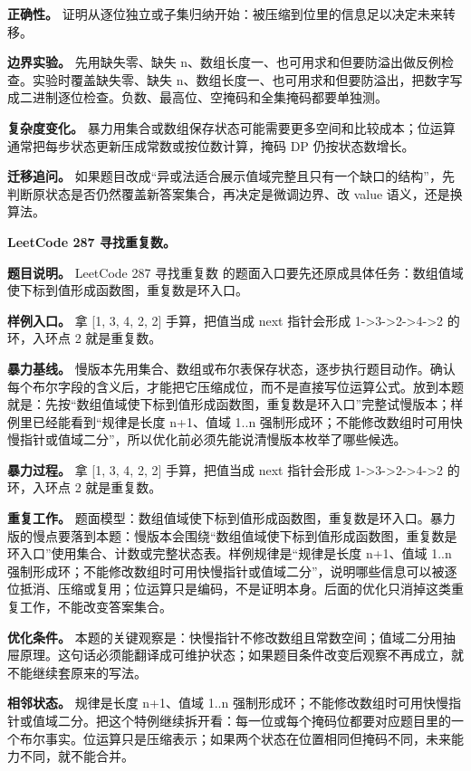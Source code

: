 \textbf{正确性。} 证明从逐位独立或子集归纳开始：被压缩到位里的信息足以决定未来转移。

\textbf{边界实验。} 先用缺失零、缺失 n、数组长度一、也可用求和但要防溢出做反例检查。实验时覆盖缺失零、缺失 n、数组长度一、也可用求和但要防溢出，把数字写成二进制逐位检查。负数、最高位、空掩码和全集掩码都要单独测。

\textbf{复杂度变化。} 暴力用集合或数组保存状态可能需要更多空间和比较成本；位运算通常把每步状态更新压成常数或按位数计算，掩码 DP 仍按状态数增长。

\textbf{迁移追问。} 如果题目改成“异或法适合展示值域完整且只有一个缺口的结构”，先判断原状态是否仍然覆盖新答案集合，再决定是微调边界、改 value 语义，还是换算法。

\noindent\textbf{LeetCode 287 寻找重复数。}

\textbf{题目说明。} LeetCode 287 寻找重复数 的题面入口要先还原成具体任务：数组值域使下标到值形成函数图，重复数是环入口。

\textbf{样例入口。} 拿 [1, 3, 4, 2, 2] 手算，把值当成 next 指针会形成 1->3->2->4->2 的环，入环点 2 就是重复数。

\textbf{暴力基线。} 慢版本先用集合、数组或布尔表保存状态，逐步执行题目动作。确认每个布尔字段的含义后，才能把它压缩成位，而不是直接写位运算公式。放到本题就是：先按“数组值域使下标到值形成函数图，重复数是环入口”完整试慢版本；样例里已经能看到“规律是长度 n+1、值域 1..n 强制形成环；不能修改数组时可用快慢指针或值域二分”，所以优化前必须先能说清慢版本枚举了哪些候选。

\textbf{暴力过程。} 拿 [1, 3, 4, 2, 2] 手算，把值当成 next 指针会形成 1->3->2->4->2 的环，入环点 2 就是重复数。

\textbf{重复工作。} 题面模型：数组值域使下标到值形成函数图，重复数是环入口。暴力版的慢点要落到本题：慢版本会围绕“数组值域使下标到值形成函数图，重复数是环入口”使用集合、计数或完整状态表。样例规律是“规律是长度 n+1、值域 1..n 强制形成环；不能修改数组时可用快慢指针或值域二分”，说明哪些信息可以被逐位抵消、压缩或复用；位运算只是编码，不是证明本身。后面的优化只消掉这类重复工作，不能改变答案集合。

\textbf{优化条件。} 本题的关键观察是：快慢指针不修改数组且常数空间；值域二分用抽屉原理。这句话必须能翻译成可维护状态；如果题目条件改变后观察不再成立，就不能继续套原来的写法。

\textbf{相邻状态。} 规律是长度 n+1、值域 1..n 强制形成环；不能修改数组时可用快慢指针或值域二分。把这个特例继续拆开看：每一位或每个掩码位都要对应题目里的一个布尔事实。位运算只是压缩表示；如果两个状态在位置相同但掩码不同，未来能力不同，就不能合并。

